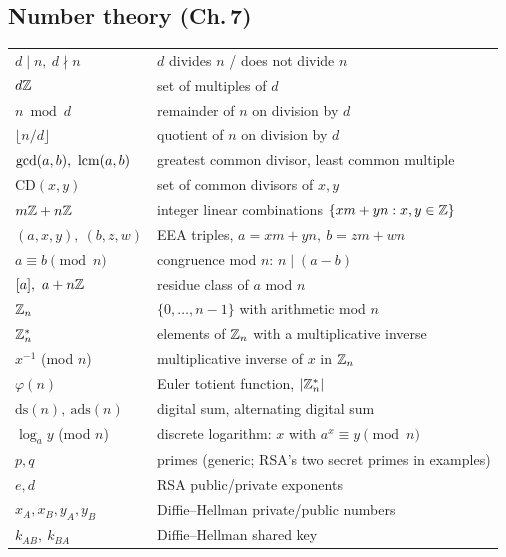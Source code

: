 \documentclass[11pt]{article}
\begin{document}
\subsection*{Number theory (Ch.\,7)}
\begin{longtable}{ll}
$d\mid n,\ d\nmid n$ & $d$ divides $n$ / does not divide $n$ \\
$d\mathbb{Z}$ & set of multiples of $d$ \\
$n\bmod d$ & remainder of $n$ on division by $d$ \\
$\lfloor n/d\rfloor$ & quotient of $n$ on division by $d$ \\
$\gcd(a,b),\ \lcmop(a,b)$ & greatest common divisor, least common multiple \\
$\mathrm{CD}(x,y)$ & set of common divisors of $x,y$ \\
$m\mathbb{Z}+n\mathbb{Z}$ & integer linear combinations $\{xm+yn : x,y\in\mathbb{Z}\}$ \\
$(a,x,y),\ (b,z,w)$ & EEA triples, $a=xm+yn,\ b=zm+wn$ \\
$a\equiv b\pmod n$ & congruence mod $n$: $n\mid(a-b)$ \\
$[a],\ a+n\Z$ & residue class of $a$ mod $n$ \\
$\mathbb{Z}_n$ & $\{0,\dots,n-1\}$ with arithmetic mod $n$ \\
$\mathbb{Z}_n^*$ & elements of $\mathbb{Z}_n$ with a multiplicative inverse \\
$x^{-1}$ (mod $n$) & multiplicative inverse of $x$ in $\mathbb{Z}_n$ \\
$\varphi(n)$ & Euler totient function, $|\mathbb{Z}_n^*|$ \\
$\mathrm{ds}(n),\ \mathrm{ads}(n)$ & digital sum, alternating digital sum \\
$\log_a y$ (mod $n$) & discrete logarithm: $x$ with $a^x\equiv y\pmod n$ \\
$p,q$ & primes (generic; RSA's two secret primes in examples) \\
$e,d$ & RSA public/private exponents \\
$x_A,x_B,y_A,y_B$ & Diffie--Hellman private/public numbers \\
$k_{AB},\ k_{BA}$ & Diffie--Hellman shared key \\
\end{longtable}
\end{document}
